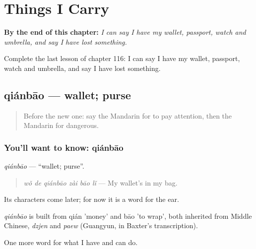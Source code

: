 
\chapter{Things I Carry}
\label{ch:zh-things-i-carry}

\begin{chapteropening}
\textbf{By the end of this chapter:} \emph{I can say I have my wallet, passport, watch and umbrella, and say I have lost something.}

Complete the last lesson of chapter 116: I can say I have my wallet, passport, watch and umbrella, and say I have lost something.
\end{chapteropening}

\section[qiánbāo]{qiánbāo — wallet; purse}

\label{lesson:ZH-C116-qianbao}



\begin{quote}
Before the new one: say the Mandarin for to pay attention, then the Mandarin for dangerous.
\end{quote}

\subsection*{You'll want to know: qiánbāo}
\emph{qiánbāo} — \textquotedblleft{}wallet; purse\textquotedblright{}.

\begin{quote}
\emph{wǒ de qiánbāo zài bāo lǐ} — My wallet's in my bag.
\end{quote}

Its characters come later; for now it is a word for the ear.

\begin{cousinweb}
\emph{qiánbāo} is built from qián 'money' and bāo 'to wrap', both inherited from Middle Chinese, \emph{dzjen} and \emph{paew} (Guangyun, in Baxter's transcription).
\end{cousinweb}

\begin{grammarlens}[title={What you've built}]
One more word for what I have and can do.
\end{grammarlens}

